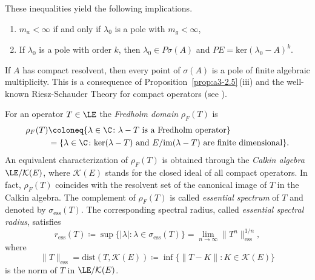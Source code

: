 \begin{example}
These inequalities yield the following implications.
\begin{enumerate}[\upshape (i)]
\item
$m_{a} < \infty$ if and only if\/ $\lambda_{0}$ is a pole with $m_{g} < \infty$,
\item
If\/ $\lambda_{0}$ is a pole with order $k$, then $\lambda_{0} \in P\sigma(A)$ and $PE = \text{ker}(\lambda_{0} - A)^{k}$.
\end{enumerate}
If\/ $A$ has compact resolvent,%
then every point of\/ $\sigma(A)$ is a pole of finite algebraic multiplicity.
This is a consequence of Proposition~\ref{prop:a3-2.5}\,(iii) and the well-known Riesz-Schauder Theory for compact operators (see \textcite[VII.4.5]{dunfordschwartz:1958}).
\end{example}
\begin{example}\label{ex:a3-3.7}	%
For an operator $T \in \LE$ the \emph{Fredholm domain} $\rho_{F}(T)$ is
\begin{equation}\label{eq:a3-3.5} 
\begin{aligned}
	\rho_{F}(T) & \coloneq  \{\lambda \in \C \colon \lambda - T \text{ is a Fredholm operator}\}\\
	& =  \{\lambda \in \C \colon \text{ker}(\lambda - T) \text{ and }  E / \mathrm{im}(\lambda - T) \text{ are finite dimensional}\}.
\end{aligned}
\end{equation}
An equivalent characterization of\/ $\rho_{F}(T)$ is obtained through the \emph{Calkin algebra}%
$\LE/\mathcal{K}(E)$, where $\mathcal{K}(E)$ stands for the closed ideal of all compact operators.
In fact, $\rho_{F}(T)$ coincides with the resolvent set of the canonical image of\/ $T$ in the Calkin algebra.
The complement of\/ $\rho_{F}(T)$ is called \emph{essential spectrum} 
of\/ $T$ and denoted by $\sigma_{\text{ess}}(T)$.
The corresponding spectral radius, called \emph{essential spectral radius},  
satisfies
\begin{equation}\label{eq:a3-3.6}
r_{\text{ess}}(T) \coloneq \sup \{|\lambda| \colon \lambda \in \sigma_{\text{ess}}(T)\} = \lim_{n \to \infty} \|T^{n}\|_{\text{ess}}^{1/n} ,
\end{equation}
where 
%
\[
	\|T\|_{\text{ess}} = \text{dist}(T,\mathcal{K}(E)) \coloneq \inf \{\|T - K\| \colon K \in \mathcal{K}(E)\}
\]
%
is the norm of\/ $T$ in $\LE/\mathcal{K}(E)$. 


\end{example}

